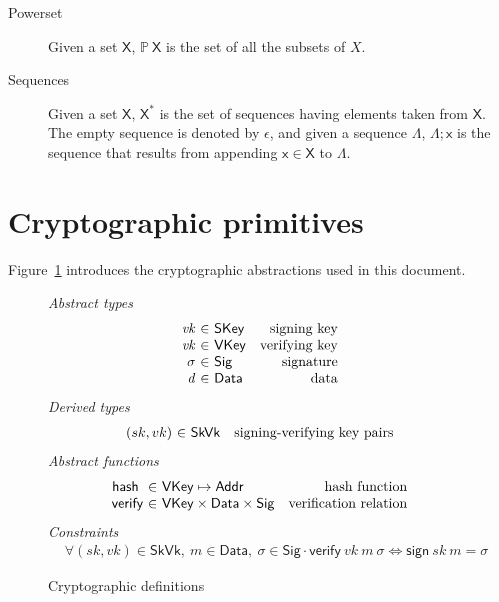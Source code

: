 \documentclass[11pt,a4paper]{article}
\newcommand{\powerset}[1]{\mathbb{P}~#1}
\newcommand{\var}[1]{\mathit{#1}}
\newcommand{\fun}[1]{\mathsf{#1}}
\newcommand{\type}[1]{\mathsf{#1}}
\newcommand{\seqof}[1]{#1^{*}}
\newcommand{\Addr}{\type{Addr}}
\newcommand{\VKey}{\type{VKey}}
\newcommand{\SKey}{\type{SKey}}
\newcommand{\SkVk}{\type{SkVk}}
\newcommand{\Sig}{\type{Sig}}
\newcommand{\Data}{\type{Data}}
\newcommand{\verify}[3]{\fun{verify} ~ #1 ~ #2 ~ #3}
\newcommand{\sign}[2]{\fun{sign} ~ #1 ~ #2}
\newcommand{\hash}[1]{\fun{hash}~ \var{#1}}
\begin{document}
\begin{description}
\item[Powerset] Given a set $\type{X}$, $\powerset{\type{X}}$ is the set of all
  the subsets of $X$.
\item[Sequences] Given a set $\type{X}$, $\seqof{\type{X}}$ is the set of
  sequences having elements taken from $\type{X}$. The empty sequence is
  denoted by $\epsilon$, and given a sequence $\Lambda$, $\Lambda; \type{x}$ is
  the sequence that results from appending $\type{x} \in \type{X}$ to
  $\Lambda$.
\end{description}

\section{Cryptographic primitives}
\label{sec:crypto-primitives}

Figure~\ref{fig:crypto-defs} introduces the cryptographic abstractions used in
this document.

\begin{figure}
  \emph{Abstract types}
  \begin{equation*}
    \begin{array}{r@{~\in~}lr}
      \var{vk} & \SKey & \text{signing key}\\            
      \var{vk} & \VKey & \text{verifying key}\\
      \sigma & \Sig  & \text{signature}\\
      \var{d} & \Data  & \text{data}\\
    \end{array}
  \end{equation*}
  \emph{Derived types}
  \begin{equation*}
    \begin{array}{r@{~\in~}lr}
      (sk, vk) & \SkVk & \text{signing-verifying key pairs}
    \end{array}
  \end{equation*}
  \emph{Abstract functions}
  \begin{equation*}
    \begin{array}{r@{~\in~}lr}
      \hash{} & \VKey \mapsto \Addr
      & \text{hash function} \\
      \fun{verify} & \VKey \times \Data \times \Sig
      & \text{verification relation}\\
    \end{array}
  \end{equation*}
  \emph{Constraints}
  \begin{align*}
    & \forall (sk, vk) \in \SkVk,~ m \in \Data,~ \sigma \in \Sig \cdot
      \verify{vk}{m}{\sigma} \iff \sign{sk}{m} = \sigma
  \end{align*}
  \caption{Cryptographic definitions}
  \label{fig:crypto-defs}
\end{figure}
\end{document}
